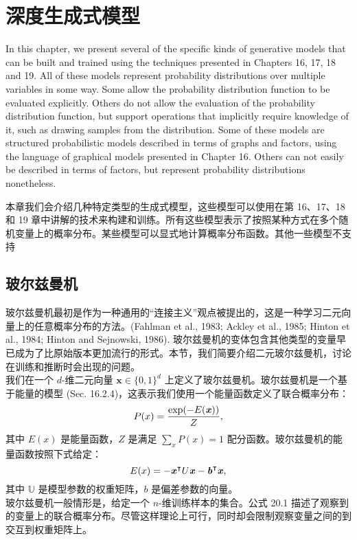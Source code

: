 \chapter{深度生成式模型}
\label{ch:generative_models}

In this chapter, we present several of the specific kinds of generative models that can be built and trained using the techniques presented in Chapters 16, 17, 18 and 19. All of these models represent probability distributions over multiple variables in some way. Some allow the probability distribution function to be evaluated explicitly. Others do not allow the evaluation of the probability distribution function, but support operations that implicitly require knowledge of it, such as drawing samples from the distribution. Some of these models are structured probabilistic models described in terms of graphs and factors, using the language of graphical models presented in Chapter 16. Others can not easily be described in terms of factors, but represent probability distributions nonetheless.

本章我们会介绍几种特定类型的生成式模型，这些模型可以使用在第 16、17、18 和 19 章中讲解的技术来构建和训练。所有这些模型表示了按照某种方式在多个随机变量上的概率分布。某些模型可以显式地计算概率分布函数。其他一些模型不支持


\section{玻尔兹曼机}
玻尔兹曼机最初是作为一种通用的“连接主义”观点被提出的，这是一种学习二元向量上的任意概率分布的方法。(Fahlman et al., 1983; Ackley et al., 1985; Hinton et al., 1984; Hinton and Sejnowski, 1986). 玻尔兹曼机的变体包含其他类型的变量早已成为了比原始版本更加流行的形式。本节，我们简要介绍二元玻尔兹曼机，讨论在训练和推断时会出现的问题。\\

我们在一个 $d$-维二元向量 $\mathbf{x} \in \{0,1\}^d$ 上定义了玻尔兹曼机。玻尔兹曼机是一个基于能量的模型 (Sec. 16.2.4)，这表示我们使用一个能量函数定义了联合概率分布：
$$P(x) = \frac{\exp(-E( \textbf{\emph{x}}))}{Z},$$
其中 $E(x)$ 是能量函数，$Z$ 是满足 $\sum_x P(x) = 1$ 配分函数。玻尔兹曼机的能量函数按照下式给定：
$$E(x) = - \textbf{\emph{x}}^\intercal U  \textbf{\emph{x}}  -  \textbf{\emph{b}}^\intercal  \textbf{\emph{x}},$$
其中 $\mathbb{U}$ 是模型参数的权重矩阵，$b$ 是偏差参数的向量。\\
玻尔兹曼机一般情形是，给定一个 $n$-维训练样本的集合。公式 20.1 描述了观察到的变量上的联合概率分布。尽管这样理论上可行，同时却会限制观察变量之间的到交互到权重矩阵上。


























